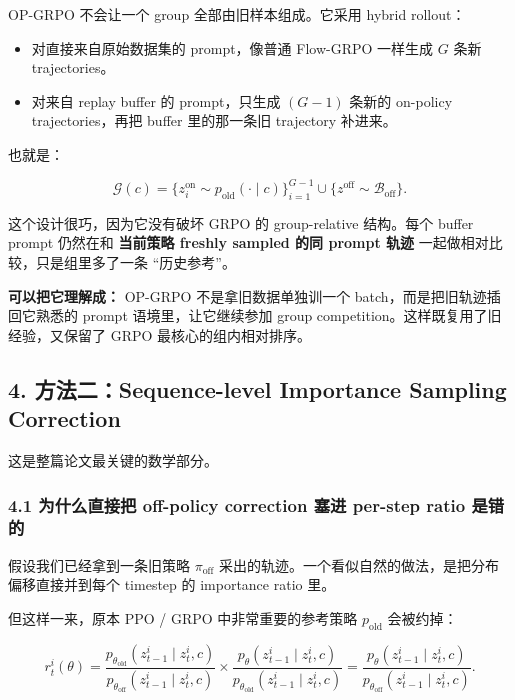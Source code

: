 OP-GRPO 不会让一个 group 全部由旧样本组成。它采用 hybrid rollout：

\begin{itemize}[leftmargin=1.5em]
  \item 对直接来自原始数据集的 prompt，像普通 Flow-GRPO 一样生成 \(G\) 条新 trajectories。
  \item 对来自 replay buffer 的 prompt，只生成 \((G-1)\) 条新的 on-policy trajectories，再把 buffer 里的那一条旧 trajectory 补进来。
\end{itemize}

也就是：

\[
\mathcal{G}(c)
=
\Big\{z_i^{\mathrm{on}} \sim p_{\mathrm{old}}(\cdot\mid c)\Big\}_{i=1}^{G-1}
\cup
\Big\{z^{\mathrm{off}} \sim \mathcal{B}_{\mathrm{off}}\Big\}.
\]

这个设计很巧，因为它没有破坏 GRPO 的 group-relative 结构。每个 buffer prompt 仍然在和 \textbf{当前策略 freshly sampled 的同 prompt 轨迹} 一起做相对比较，只是组里多了一条 ``历史参考''。

\begin{intubox}
\textbf{可以把它理解成：} OP-GRPO 不是拿旧数据单独训一个 batch，而是把旧轨迹插回它熟悉的 prompt 语境里，让它继续参加 group competition。这样既复用了旧经验，又保留了 GRPO 最核心的组内相对排序。
\end{intubox}

\subsection{4. 方法二：Sequence-level Importance Sampling Correction}

这是整篇论文最关键的数学部分。

\subsubsection{4.1 为什么直接把 off-policy correction 塞进 per-step ratio 是错的}

假设我们已经拿到一条旧策略 \(\pi_{\mathrm{off}}\) 采出的轨迹。一个看似自然的做法，是把分布偏移直接并到每个 timestep 的 importance ratio 里。

但这样一来，原本 PPO / GRPO 中非常重要的参考策略 \(p_{\mathrm{old}}\) 会被约掉：

\[
r_t^i(\theta)
=
\frac{p_{\theta_{\mathrm{old}}}(z_{t-1}^i\mid z_t^i,c)}{p_{\theta_{\mathrm{off}}}(z_{t-1}^i\mid z_t^i,c)}
\times
\frac{p_{\theta}(z_{t-1}^i\mid z_t^i,c)}{p_{\theta_{\mathrm{old}}}(z_{t-1}^i\mid z_t^i,c)}
=
\frac{p_{\theta}(z_{t-1}^i\mid z_t^i,c)}{p_{\theta_{\mathrm{off}}}(z_{t-1}^i\mid z_t^i,c)}.
\]


